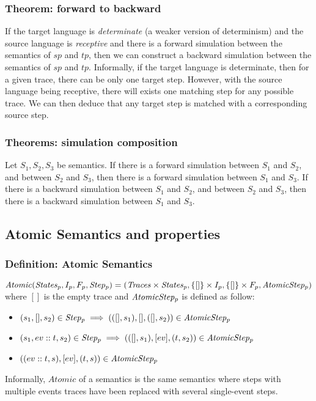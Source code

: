 \backwardforward

\subsubsection{Theorem: forward to backward} If the target language is \textit{determinate} (a weaker version of determinism) and the source language is \textit{receptive} and there is a forward simulation between the semantics of $sp$ and $tp$, then we can construct a backward simulation between the semantics of $sp$ and $tp$. Informally, if the target language is determinate, then for a given trace, there can be only one target step. However, with the source language being receptive, there will exists one matching step for any possible trace. We can then deduce that any target step is matched with a corresponding source step.

\subsubsection{Theorems: simulation composition} Let $S_1,S_2,S_3$ be semantics.
If there is a forward simulation between $S_1$ and $S_2$, and between $S_2$ and $S_3$, then there is a forward simulation between $S_1$ and $S_3$.
If there is a backward simulation between $S_1$ and $S_2$, and between $S_2$ and $S_3$, then there is a backward simulation between $S_1$ and $S_3$.

\subsection{Atomic Semantics and properties}
\subsubsection{Definition: Atomic Semantics} $\mathit{Atomic}(\mathit{States_{p}},I_p,F_p,\mathit{Step_{p}}) = (\mathit{Traces}\times\mathit{States_{p}},\{[]\}\times I_p,\{[]\}\times F_p,\mathit{AtomicStep_{p}})$ where $[]$ is the empty trace and $\mathit{AtomicStep_{p}}$ is defined as follow:
\begin{itemize}
\item $(s_1,[],s_2)\in\mathit{Step_{p}}\implies(([],s_1),[],([],s_2))\in\mathit{AtomicStep_{p}}$
\item $(s_1,ev::t,s_2)\in\mathit{Step_{p}}\implies(([],s_1),[ev],(t,s_2))\in\mathit{AtomicStep_{p}}$
\item $((ev::t,s),[ev],(t,s))\in\mathit{AtomicStep_{p}}$
\end{itemize}
Informally, $\mathit{Atomic}$ of a semantics is the same semantics where steps with multiple events traces have been replaced with several single-event steps.


